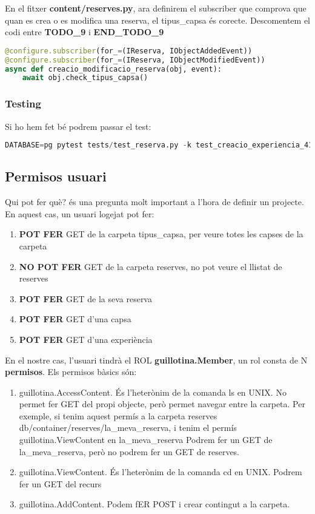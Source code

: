 \documentclass[a4paper, 11pt]{article}
\begin{document}
En el fitxer \textbf{content/reserves.py}, ara definirem el subscriber
que comprova que quan es crea o es modifica una reserva, el
tipus\_capsa és corecte. Descomentem el codi entre \textbf{TODO\_9} i
\textbf{END\_TODO\_9}

\begin{lstlisting}[language=Python, caption=Definició subscriber Reserva]
@configure.subscriber(for_=(IReserva, IObjectAddedEvent))
@configure.subscriber(for_=(IReserva, IObjectModifiedEvent))
async def creacio_modificacio_reserva(obj, event):
    await obj.check_tipus_capsa()
  \end{lstlisting}

\subsubsection{Testing}
Si ho hem fet bé podrem passar el test:
\begin{lstlisting}[language=Python, caption=Testing 6]
  DATABASE=pg pytest tests/test_reserva.py -k test_creacio_experiencia_412
\end{lstlisting}


\subsection{Permisos usuari}
Qui pot fer què? és una pregunta molt important a l'hora de definir un
projecte. En aquest cas, un usuari logejat pot fer:
\begin{enumerate}
\item \textbf{POT FER} GET de la carpeta tipus\_capsa, per veure totes les capses de la carpeta
\item \textbf{NO POT FER} GET de la carpeta reserves, no pot veure el llistat de reserves
\item \textbf{POT FER} GET de la seva reserva
\item \textbf{POT FER} GET d'una capsa
\item \textbf{POT FER} GET d'una experiència
\end{enumerate}
En el nostre cas, l'usuari tindrà el ROL \textbf{guillotina.Member},
un rol consta de N \textbf{permisos}. Els permisos bàsics són:

\begin{enumerate}
\item guillotina.AccessContent. És l'heterònim de la comanda ls en UNIX. No permet fer GET del propi objecte, però permet navegar entre la carpeta. Per exemple, si tenim aquest permís a la carpeta reserves db/container/reserves/la\_meva\_reserva, i tenim el permís guillotina.ViewContent en la\_meva\_reserva Podrem fer un GET de la\_meva\_reserva, però no podrem fer un GET de reserves.
\item guillotina.ViewContent. És l'heterònim de la comanda cd en UNIX. Podrem fer un GET del recurs
\item guillotina.AddContent. Podem fER POST i crear contingut a la carpeta.
\end{enumerate}
\end{document}
